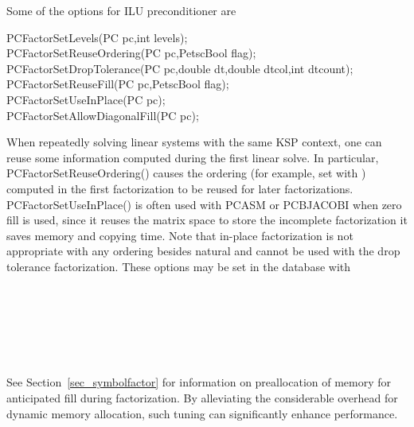 Some of the options for ILU preconditioner are
\begin{tabbing}
  PCFactorSetLevels(PC pc,int levels);\\
  PCFactorSetReuseOrdering(PC pc,PetscBool  flag);\\
  PCFactorSetDropTolerance(PC pc,double dt,double dtcol,int dtcount);\\
  PCFactorSetReuseFill(PC pc,PetscBool  flag);\\
  PCFactorSetUseInPlace(PC pc); \\
  PCFactorSetAllowDiagonalFill(PC pc);
\end{tabbing}

When repeatedly solving linear systems with the same KSP
context, one can reuse some information  computed
during the first linear solve.
In particular, PCFactorSetReuseOrdering() causes the ordering  (for example, set with
 ) computed in the first factorization to be reused
for later factorizations. 
PCFactorSetUseInPlace() is often used with
PCASM or PCBJACOBI when zero fill is used, since it reuses the
matrix space to store the incomplete factorization it saves memory and
copying time. Note that in-place factorization is not appropriate with
any ordering besides natural and cannot be used with the drop tolerance
factorization. These options may be set in the database with
\begin{tabbing}
   \\
   \\
   \\
   \\
   \\
\end{tabbing}
 
 

See Section~\ref{sec_symbolfactor} for information on preallocation
of memory for anticipated fill during factorization.
By alleviating the considerable overhead for dynamic memory allocation,
such tuning can significantly enhance performance.

